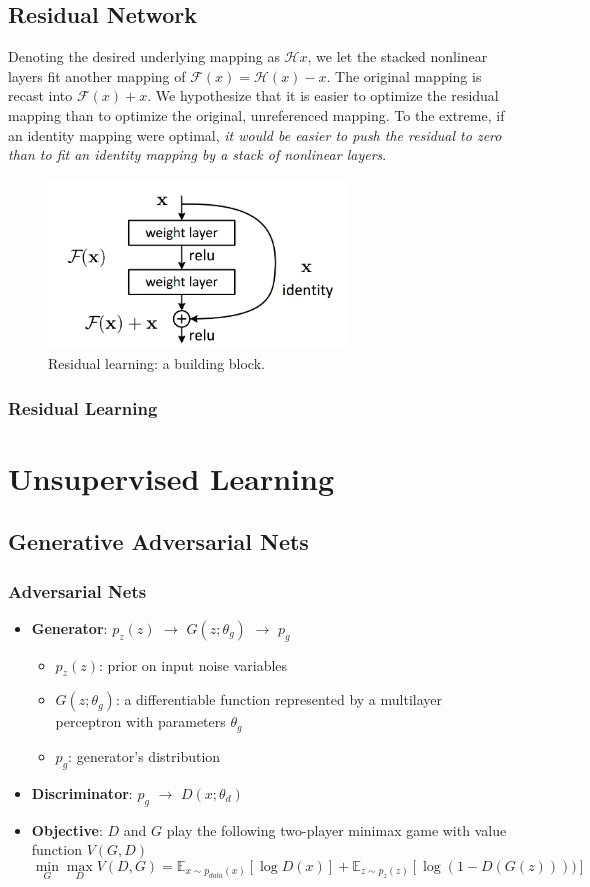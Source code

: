 \documentclass[a4paper, 12pt]{book} %
\begin{document}
\section{Residual Network}
Denoting the desired underlying mapping as $\mathcal{H}{x}$, we let the stacked nonlinear
layers fit another mapping of $\mathcal{F}{(x)}=\mathcal{H}{(x)}-x$. The original mapping is recast into $\mathcal{F}{(x)}+x$. We hypothesize that it
is easier to optimize the residual mapping than to optimize
the original, unreferenced mapping. To the extreme, if an
identity mapping were optimal, \emph{it would be easier to push
the residual to zero than to fit an identity mapping by a stack of nonlinear layers}.
\begin{figure}[htpb]
	\centering
	\includegraphics[width=8cm]{figures/resnet.png}
	\caption{Residual learning: a building block.}
	\label{fig:boat1}
\end{figure}
\subsection{Residual Learning}





\chapter{Unsupervised Learning}
\section{Generative Adversarial Nets}
\subsection{Adversarial Nets}
\begin{itemize}
	\item \textbf{Generator}: $p_z(z)$ $\to$ $G(z;\theta_g)$ $\to$ $p_g$
	\begin{itemize}
		\item $p_z(z)$: prior on input noise variables
		\item $G(z;\theta_g)$: a differentiable function represented by a multilayer perceptron with parameters $\theta_g$
		\item $p_g$: generator's distribution
	\end{itemize}
	\item \textbf{Discriminator}: $p_g$ $\to$ $D(x;\theta_d)$
	\item \textbf{Objective}: $D$ and $G$ play the following two-player minimax game with value function $V(G, D)$
	$$\min_G\max_D{V(D,G)}=\mathbb{E}_{x\sim p_{data}{(x)}}[\log{D(x)}]+\mathbb{E}_{z\sim p_{z}{(z)}}[\log{(1-D(G(z))))}]$$
\end{itemize}
\end{document}
